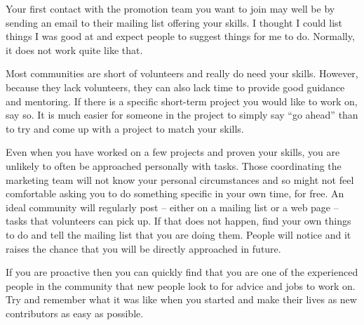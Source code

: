 Your first contact with the promotion team you want to join may well be by sending an email to their mailing list offering your skills. I thought I could list things I was good at and expect people to suggest things for me to do. Normally, it does not work quite like that.

Most communities are short of volunteers and really do need your skills. However, because they lack volunteers, they can also lack time to provide good guidance and mentoring. If there is a specific short-term project you would like to work on, say so. It is much easier for someone in the project to simply say ``go ahead'' than to try and come up with a project to match your skills.

Even when you have worked on a few projects and proven your skills, you are unlikely to often be approached personally with tasks. Those coordinating the marketing team will not know your personal circumstances and so might not feel comfortable asking you to do something specific in your own time, for free. An ideal community will regularly post -- either on a mailing list or a web page -- tasks that volunteers can pick up. If that does not happen, find your own things to do and tell the mailing list that you are doing them. People will notice and it raises the chance that you will be directly approached in future.

If you are proactive then you can quickly find that you are one of the experienced people in the community that new people look to for advice and jobs to work on. Try and remember what it was like when you started and make their lives as new contributors as easy as possible.
